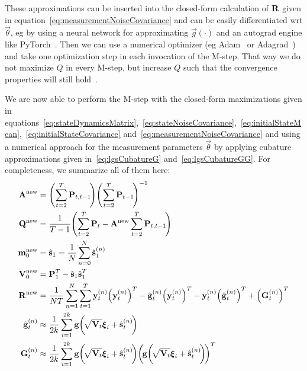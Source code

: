 	These approximations can be inserted into the closed-form calculation of \(\boldsymbol{\mathrm{R}}\) given in equation~\eqref{eq:measurementNoiseCovariance} and can be easily differentiated \ac{wrt} \(\vec{\theta}\), \ac{eg} by using a neural network for approximating \(\vec{g}(\cdot)\) and an autograd engine like PyTorch~\cite{paszkePyTorchImperativeStyle2019}. Then we can use a numerical optimizer (\ac{eg} Adam~\cite{kingmaAdamMethodStochastic2017} or Adagrad~\cite{duchiAdaptiveSubgradientMethods2011}) and take one optimization step in each invocation of the M-step. That way we do not maximize \(Q\) in every M-step, but increase \(Q\) such that the convergence properties will still hold~\cite{moonExpectationmaximizationAlgorithm1996}.
	
	We are now able to perform the M-step with the closed-form maximizations given in equations~\eqref{eq:stateDynamicsMatrix},~\eqref{eq:stateNoiseCovariance},~\eqref{eq:initialStateMean},~\eqref{eq:initialStateCovariance} and~\eqref{eq:measurementNoiseCovariance} and using a numerical approach for the measurement parameters \(\vec{\theta}\) by applying cubature approximations given in~\eqref{eq:lgsCubatureG} and~\eqref{eq:lgsCubatureGG}. For completeness, we summarize all of them here:
	\begin{align*}
		\mat{A}^\new &= \Bigg(\! \sum_{t = 2}^{T} \mat{P}_{t, t - 1} \!\Bigg) \Bigg(\! \sum_{t = 2}^{T} \mat{P}_{t - 1} \!\Bigg)^{-1} \\
		\mat{Q}^\new &= \frac{1}{T - 1} \Bigg(\! \sum_{t = 2}^{T} \mat{P}_t - \mat{A}^\new \sum_{t = 2}^{T} \mat{P}_{t, t - 1} \!\Bigg) \\
		\vec{m}_0^\new &= \hat{\vec{s}}_1 = \frac{1}{N} \sum_{n = 0}^{N} \hat{\vec{s}}_1^{(n)} \\
		\mat{V}_0^\new &= \mat{P}_1^T - \hat{\vec{s}}_1 \hat{\vec{s}}_1^T \\
		\mat{R}^\new &= \frac{1}{NT} \sum_{n = 1}^{N} \sum_{t = 1}^{T} \vec{y}_t^{(n)} \Big(\vec{y}_t^{(n)}\Big)^T - \hat{\vec{g}}_t^{(n)} \Big(\vec{y}_t^{(n)}\Big)^T - \vec{y}_t^{(n)} \Big(\hat{\vec{g}}_t^{(n)}\Big)^T + \Big(\mat{G}_t^{(n)}\Big)^T \\
		\hat{\vec{g}}_t^{(n)} &\approx \frac{1}{2k} \sum_{i = 1}^{2k} \vec{g}\bigg(\!\sqrt{\mat{V}_t} \vec{\xi}_i + \hat{\vec{s}}_t^{(n)}\!\bigg) \\
		\mat{G}_t^{(n)} &\approx \frac{1}{2k} \sum_{i = 1}^{2k} \vec{g}\bigg(\!\sqrt{\mat{V}_t} \vec{\xi}_i + \hat{\vec{s}}_t^{(n)}\!\bigg) \bigg(\!\vec{g}\bigg(\!\sqrt{\mat{V}_t} \vec{\xi}_i + \hat{\vec{s}}_t^{(n)}\!\bigg)\!\bigg)^T
	\end{align*}


